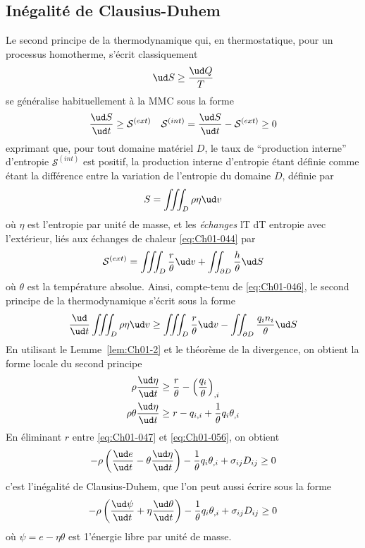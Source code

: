 \subsection{Inégalité de Clausius-Duhem} \label{ssec:Ch01-3.2}
Le second principe de la thermodynamique qui, en thermostatique, pour un processus homotherme, s'écrit classiquement
\begin{equation}
    \ud S \geq \frac{\ud Q}{T}
    \label{eq:Ch01-051}
\end{equation}
se généralise habituellement à la MMC sous la forme 
\begin{equation}
    \frac{\ud S}{\ud t} \geq \mathcal{S}^{(ext)} \quad \mathcal{S}^{(int)} = \frac{\ud S}{\ud t} - \mathcal{S}^{(ext)} \geq 0
    \label{eq:Ch01-052}
\end{equation}
exprimant que, pour tout domaine matériel $D$, le taux de ``production interne'' d'entropie $\mathcal{S}^{(int)}$ est positif, la production interne d'entropie étant définie comme étant la différence entre la variation de l'entropie du domaine $D$, définie par
\begin{equation}
    S = \iiint_{D} \rho \eta \ud v
    \label{eq:Ch01-053}
\end{equation}
où $\eta$ est l'entropie par unité de masse, et les \emph{échanges} lT dT entropie avec l'extérieur, liés aux échanges de chaleur \eqref{eq:Ch01-044} par
\begin{equation}
    \mathcal{S}^{(ext)} = \iiint_{D} \frac{r}{\theta} \ud v + \iint_{\partial D} \frac{h}{\theta} \ud S
    \label{eq:Ch01-054}
\end{equation}
où $\theta$ est la température absolue.
Ainsi, compte-tenu de \eqref{eq:Ch01-046}, le second principe de la thermodynamique s'écrit sous la forme
\begin{equation}
    \frac{\ud}{\ud t} \iiint_D \rho \eta \ud v \geq \iiint_{D} \frac{r}{\theta} \ud v - \iint_{\partial D} \frac{q_i n_i}{\theta} \ud S
    \label{eq:Ch01-055}
\end{equation}
En utilisant le Lemme~\ref{lem:Ch01-2} et le théorème de la divergence, on obtient la forme locale du second principe
\begin{align}
        \rho \frac{\ud \eta}{\ud t}  &\geq \frac{r}{\theta} - \left( \frac{q_i}{\theta} \right)_{,i} \nonumber\\
        \rho \theta \frac{\ud \eta}{\ud t}  &\geq r - q_{i,i} + \frac{1}{\theta} q_i\theta_{,i}
    \label{eq:Ch01-056}
\end{align}
En éliminant $r$ entre \eqref{eq:Ch01-047} et \eqref{eq:Ch01-056}, on obtient
\begin{equation}
    -\rho \left( \frac{\ud e}{\ud t} - \theta \frac{\ud \eta}{\ud t} \right) - \frac{1}{\theta}q_i \theta_{,i} + \sigma_{ij}D_{ij} \geq 0
    \label{eq:Ch01-057}
\end{equation}
c'est l'inégalité de Clausius-Duhem, que l'on peut aussi écrire sous la forme
\begin{equation}
    -\rho \left( \frac{\ud \psi}{\ud t} + \eta \frac{\ud \theta}{\ud t} \right) - \frac{1}{\theta}q_i \theta_{,i} + \sigma_{ij}D_{ij} \geq 0
    \label{eq:Ch01-058}
\end{equation}
où $\psi = e -\eta \theta$ est 1'énergie libre par unité de masse.

